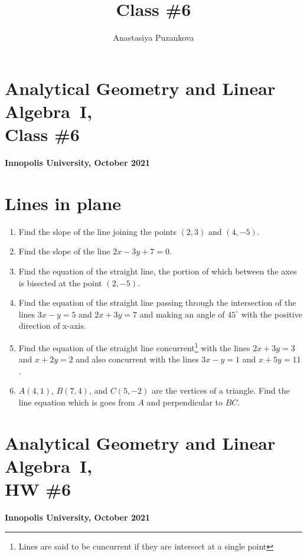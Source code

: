 \documentclass[a4paper,10pt]{article}
\title{Class \#6}
\author{Anastasiya Puzankova}
\date{}
\begin{document}
\section*{Analytical Geometry and Linear Algebra~I, \\ Class \#6}
\noindent\textbf{Innopolis University, October 2021}
\\

\section{Lines in plane}

\begin{enumerate}

\item
Find the slope of the line joining the points $(2, 3)$ and $(4, -5)$.

\item
Find the slope of the line $2x - 3y + 7 = 0.$

\item
Find the equation of the straight line, the portion of which between the axes is bisected at the point $(2, -5)$.

\item
Find the equation of the straight line passing through the intersection of the lines $3x - y = 5$ and $2x + 3y = 7$ and making an angle of $45^{\circ}$ with the positive direction of x-axis.

\item
Find the equation of the straight line concurrent\footnote{Lines are said to be cuncurrent if they are intersect at a single point} with the lines $2x + 3y = 3$ and $x + 2y = 2$ and also concurrent with the lines $3x - y = 1$ and $x + 5y = 11$.

\item
$A(4, 1)$, $B(7, 4)$, and $C(5, -2)$ are the vertices of a triangle. Find the line equation which is goes from $A$ and perpendicular to $BC$.

\end{enumerate}

\newpage
\section*{Analytical Geometry and Linear Algebra~I, \\ HW \#6}
\noindent\textbf{Innopolis University, October 2021}
\\
\end{document}
